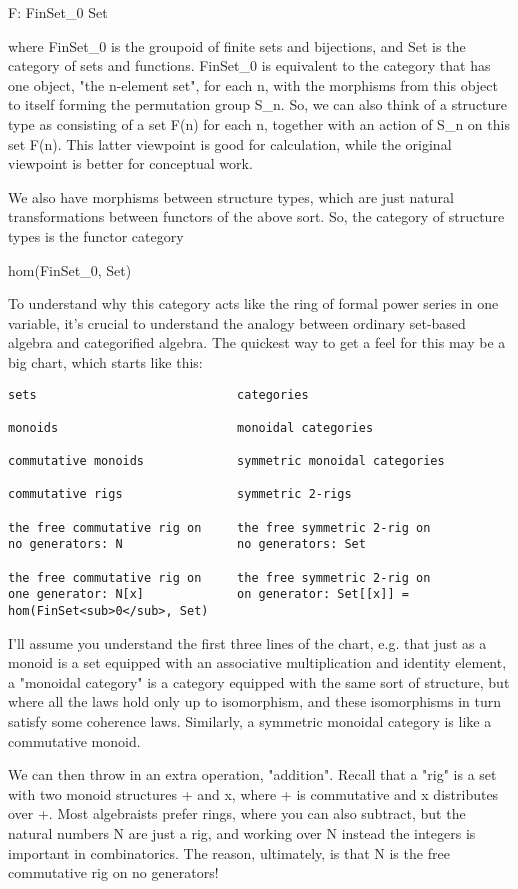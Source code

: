 F: FinSet_{0} \to  Set

where FinSet_{0} is the groupoid of finite sets and bijections,
and Set is the category of sets and functions.  FinSet_{0} is 
equivalent to the category that has one object, "the n-element
set", for each n, with the morphisms from this object to itself
forming the permutation group S_{n}.  So, we can also think of a
structure type as consisting of a set F(n) for each n, together 
with an action of S_{n} on this set F(n).  This latter viewpoint is 
good for calculation, while the original viewpoint is better for
conceptual work.

We also have morphisms between structure types, which are just
natural transformations between functors of the above sort.  
So, the category of structure types is the functor category 

hom(FinSet_{0}, Set)

To understand why this category acts like the ring of formal
power series in one variable, it's crucial to understand the 
analogy between ordinary set-based algebra and categorified 
algebra.  The quickest way to get a feel for this may be a big 
chart, which starts like this:

\begin{verbatim}
sets                            categories

monoids                         monoidal categories

commutative monoids             symmetric monoidal categories

commutative rigs                symmetric 2-rigs

the free commutative rig on     the free symmetric 2-rig on
no generators: N                no generators: Set

the free commutative rig on     the free symmetric 2-rig on
one generator: N[x]             on generator: Set[[x]] = hom(FinSet<sub>0</sub>, Set) 
\end{verbatim}
    
I'll assume you understand the first three lines of the chart,
e.g. that just as a monoid is a set equipped with an associative
multiplication and identity element, a "monoidal category" is
a category equipped with the same sort of structure, but where 
all the laws hold only up to isomorphism, and these isomorphisms
in turn satisfy some coherence laws.  Similarly, a symmetric 
monoidal category is like a commutative monoid.  

We can then throw in an extra operation, "addition".  Recall that 
a "rig" is a set with two monoid structures + and x, where + is 
commutative and x distributes over +.  Most algebraists prefer
rings, where you can also subtract, but the natural numbers N are
just a rig, and working over N instead the integers is important in 
combinatorics.
The reason, ultimately, is that N is the free commutative rig on no 
generators!  

